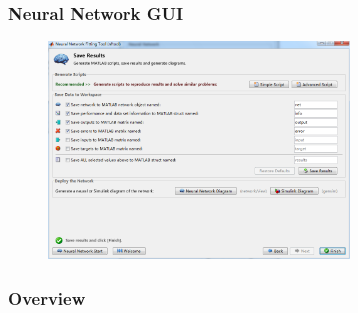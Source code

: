 \documentclass[slidestop,compress,mathserif,c]{beamer}
\begin{document}
\begin{frame}
\frametitle{Neural Network GUI}

\begin{figure}
\centering
\includegraphics[width=8cm]{12}
\end{figure}
\end{frame}


\begin{frame}
\frametitle{Overview}


\end{frame}
\end{document}
